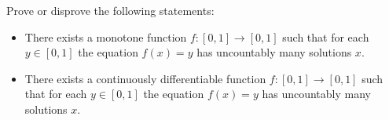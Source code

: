 Prove or disprove the following statements:\begin{itemize}

\item[(a)] There exists a monotone function \(f \colon  [0, 1] \to [0, 1]\) such that for each \(y \in [0, 1]\) the equation \(f(x) = y\) has uncountably many solutions \(x\).
\item[(b)] There exists a continuously differentiable function \(f \colon  [0, 1] \to [0, 1]\) such that for each \(y \in [0, 1]\) the equation \(f(x) = y\) has uncountably many solutions \(x\).
\end{itemize}
